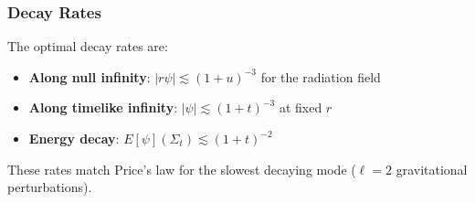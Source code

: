 \documentclass[12pt,a4paper]{article}
\begin{document}
\subsubsection{Decay Rates}
The optimal decay rates are:
\begin{itemize}
    \item \textbf{Along null infinity}: $|r\psi| \lesssim (1+u)^{-3}$ for the radiation field
    \item \textbf{Along timelike infinity}: $|\psi| \lesssim (1+t)^{-3}$ at fixed $r$
    \item \textbf{Energy decay}: $E[\psi](\Sigma_t) \lesssim (1+t)^{-2}$
\end{itemize}

These rates match Price's law for the slowest decaying mode ($\ell = 2$ gravitational perturbations).
\end{document}

